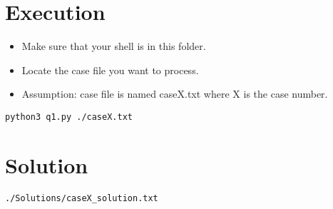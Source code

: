 \documentclass[11pt]{article}
\author{DESKTOP-OEFS7VE}
\date{\today}
\title{}
\begin{document}
\tableofcontents

\section{Execution}
\label{sec:org84fe664}
\begin{itemize}
\item Make sure that your shell is in this folder.
\item Locate the case file you want to process.
\item Assumption: case file is named caseX.txt where X is the case number.
\end{itemize}
\lstset{language=shell,label= ,caption= ,captionpos=b,numbers=none}
\begin{lstlisting}
python3 q1.py ./caseX.txt
\end{lstlisting}
\section{Solution}
\label{sec:org7ef71ec}
\lstset{language=shell,label= ,caption= ,captionpos=b,numbers=none}
\begin{lstlisting}
./Solutions/caseX_solution.txt
\end{lstlisting}
\end{document}
